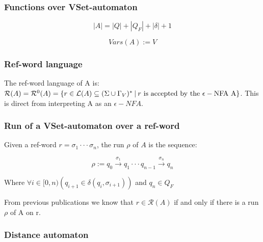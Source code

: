 \documentclass{article}
\newcommand{\set}[1]{\left\{#1\right\}}
\newcommand{\paren}[1]{\left(#1\right)}
\newcommand{\st}{\ \vline \ }
\newcommand{\lra}{\longrightarrow}
\begin{document}
\subsubsection*{Functions over VSet-automaton}

\begin{equation}
    |A| = |Q| + |Q_F| + |\delta| + 1
\end{equation}

\begin{equation}
    Vars(A) := V
\end{equation}

\subsubsection*{Ref-word language}
The ref-word language of A is: $\mathcal{R}(A) = \mathcal{R}^0(A)
= \set{r \in \mathcal{L}(A)\subseteq(\Sigma\cup\Gamma_V)^*\st
r\mathrm{\ is\ accepted\ by\ the\ \epsilon-NFA\ A}}$. This is direct
from interpreting A as an $\epsilon-NFA$.

\subsubsection*{Run of a VSet-automaton over a ref-word}

Given a ref-word $r = \sigma_1\cdot\cdot\cdot\sigma_n$, the run
$\rho$ of $A$ is the sequence:

\begin{equation}
    \rho:=q_0\overset{\sigma_1}{\lra}q_1 \cdot\cdot\cdot q_{n-1}
    \overset{\sigma_n}{\lra}q_n
\end{equation}

Where $\forall i \in [0,n)\paren{q_{i+1} \in \delta(q_i,\sigma_{i+1})}$
and $q_n\in Q_F$

From previous publications we know that $r \in \mathcal{R}(A)$ if
and only if there is a run $\rho$ of A on r.

\newpage
\subsubsection*{Distance automaton}
\end{document}
